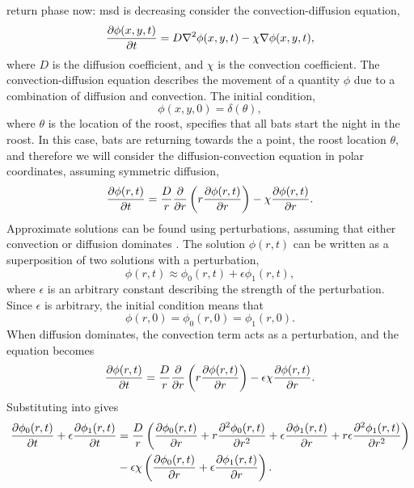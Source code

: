 {\huge return phase now: msd is decreasing}
 consider the convection-diffusion equation,
%
\begin{equation}
  \frac{\partial \phi(x,y,t)}{\partial t} = D\nabla^2\phi(x,y,t) - \chi \nabla\phi(x,y,t),
\end{equation}
%
where $D$ is the diffusion coefficient, and $\chi$ is the convection coefficient. The convection-diffusion equation describes the movement of a quantity $\phi$ due to a combination of diffusion and convection. The initial condition,
%
\begin{equation}
  \phi(x,y,0) = \delta(\theta),
\end{equation}
%
where $\theta$ is the location of the roost, specifies that all bats start the night in the roost.
%
In this case, bats are returning towards the a point, the roost location $\theta$, and therefore we will consider the diffusion-convection equation in polar coordinates, assuming symmetric diffusion,
%
\begin{equation}
  \frac{\partial \phi(r,t)}{\partial t} = \frac{D}{r} \frac{\partial }{\partial r}\left(r \frac{\partial \phi(r,t)}{\partial r} \right) - \chi \frac{\partial \phi(r,t)}{\partial r}.
\end{equation}
%
Approximate solutions can be found using perturbations, assuming that either convection or diffusion dominates \cite{hinchperturbation}. The solution $\phi(r,t)$ can be written as a superposition of two solutions with a perturbation,
%
\begin{equation}
  \phi(r,t) \approx \phi_0(r,t) + \epsilon \phi_1(r,t),
  \label{eqn:phi_perturbation}
\end{equation}
%
where $\epsilon$ is an arbitrary constant describing the strength of the perturbation. Since $\epsilon$ is arbitrary, the initial condition means that
%
\begin{equation}
  \phi(r,0) = \phi_0(r,0) = \phi_1(r,0).
\end{equation}
%
When diffusion dominates, the convection term acts as a perturbation, and the equation becomes
%
\begin{equation}
  \frac{\partial \phi(r,t)}{\partial t} = \frac{D}{r} \frac{\partial }{\partial r}\left(r \frac{\partial \phi(r,t)}{\partial r} \right) - \epsilon\chi \frac{\partial \phi(r,t)}{\partial r}.
  \label{eqn:convection_perturbation}
\end{equation}
%
Substituting  into  gives
%
\begin{equation}
\begin{split}
  \frac{\partial \phi_0(r,t)}{\partial t} + \epsilon\frac{\partial \phi_1(r,t)}{\partial t} &= \frac{D}{r} \left( \frac{\partial \phi_0(r,t)}{\partial r} + r \frac{\partial^2 \phi_0(r,t)}{\partial r^2} + \epsilon\frac{\partial \phi_1(r,t)}{\partial r} + r\epsilon \frac{\partial^2 \phi_1(r,t)}{\partial r^2}\right)  \\
  &- \epsilon\chi \left( \frac{\partial \phi_0(r,t)}{\partial r} + \epsilon \frac{\partial \phi_1(r,t)}{\partial r} \right) .
  \end{split}
\end{equation}
